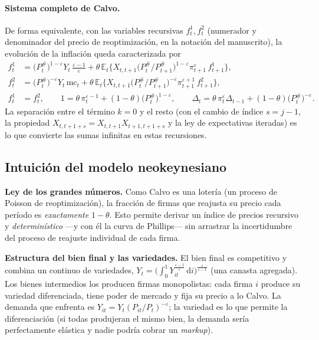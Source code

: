 \documentclass[11pt]{article}
\theoremstyle{definition}
\newcommand{\E}{\mathbb{E}}
\newcommand{\dd}{\,\mathrm{d}}
\newcommand{\mc}{\mathrm{mc}}
\begin{document}
\paragraph{Sistema completo de Calvo.} De forma equivalente, con las variables recursivas
$f^{1}_{t},f^{2}_{t}$ (numerador y denominador del precio de reoptimización, en la notación del
manuscrito), la evolución de la inflación queda caracterizada por
\begin{align}
f^{1}_{t}&=\big(P_{t}^{\#}\big)^{1-\varepsilon}Y_{t}\,\frac{\varepsilon-1}{\varepsilon}
+\theta\,\E_{t}\Big\{X_{t,t+1}\big(P_{t}^{\#}/P_{t+1}^{\#}\big)^{1-\varepsilon}\pi_{t+1}^{\varepsilon}\,f^{1}_{t+1}\Big\},\\
f^{2}_{t}&=\big(P_{t}^{\#}\big)^{-\varepsilon}Y_{t}\,\mc_{t}
+\theta\,\E_{t}\Big\{X_{t,t+1}\big(P_{t}^{\#}/P_{t+1}^{\#}\big)^{-\varepsilon}\pi_{t+1}^{\varepsilon+1}\,f^{2}_{t+1}\Big\},\\
f^{1}_{t}&=f^{2}_{t},\qquad
1=\theta\,\pi_{t}^{\varepsilon-1}+(1-\theta)\big(P_{t}^{\#}\big)^{1-\varepsilon},\qquad
\Delta_{t}=\theta\,\pi_{t}^{\varepsilon}\Delta_{t-1}+(1-\theta)\big(P_{t}^{\#}\big)^{-\varepsilon}.
\end{align}
La separación entre el término $k=0$ y el resto (con el cambio de índice $s=j-1$, la propiedad
$X_{t,t+1+s}=X_{t,t+1}X_{t+1,t+1+s}$ y la ley de expectativas iteradas) es lo que convierte las sumas
infinitas en estas recursiones.

\subsection{Intuición del modelo neokeynesiano}

\textbf{Ley de los grandes números.} Como Calvo es una lotería (un proceso de Poisson de
reoptimización), la fracción de firmas que reajusta su precio cada período es \emph{exactamente}
$1-\theta$. Esto permite derivar un índice de precios recursivo y \emph{determinístico} ---y con él la
curva de Phillips--- sin arrastrar la incertidumbre del proceso de reajuste individual de cada firma.

\textbf{Estructura del bien final y las variedades.} El bien final es competitivo y combina un continuo
de variedades, $Y_{t}=\big(\int_{0}^{1}Y_{it}^{\frac{\varepsilon-1}{\varepsilon}}\dd i\big)^{\frac{\varepsilon}{\varepsilon-1}}$
(una canasta agregada). Los bienes intermedios los producen firmas monopolistas: cada firma $i$ produce
su variedad diferenciada, tiene poder de mercado y fija su precio a lo Calvo. La demanda que enfrenta
es $Y_{it}=Y_{t}(P_{it}/P_{t})^{-\varepsilon}$; la variedad es lo que permite la diferenciación (si
todas produjeran el mismo bien, la demanda sería perfectamente elástica y nadie podría cobrar un
\emph{markup}).
\end{document}
